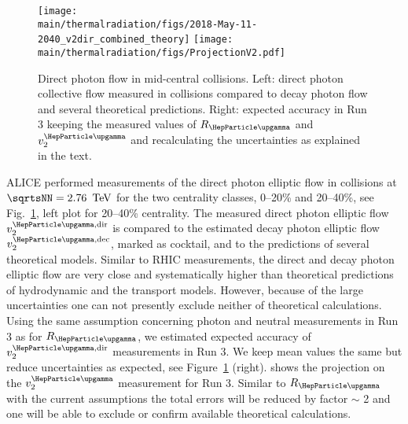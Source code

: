 \begin{figure}[htb]
\centering
\texttt{[image: \\main/thermalradiation/figs/2018-May-11-2040\_v2dir\_combined\_theory]}
\texttt{[image: \\main/thermalradiation/figs/ProjectionV2.pdf]}
\caption{Direct photon flow in mid-central collisions. Left: direct photon collective flow measured in \PbPb{} collisions compared to decay photon flow and several theoretical predictions. Right: expected accuracy in Run 3 keeping the  measured values of $R_{\PGg}$ and $v_{2}^{\PGg}$ and recalculating the uncertainties as explained in the text. }
\label{fig:RealPhotonsV2dir}
\end{figure}

ALICE performed measurements of the direct photon elliptic flow \cite{Acharya:2018bdy} in \PbPb{} collisions at $\sqrtsNN=\unit[2.76]{\UTeV}$ for the two centrality classes, 0--20\% and 20--40\%, see Fig.~\ref{fig:RealPhotonsV2dir}, left plot for 20--40\% centrality.
The measured direct photon elliptic flow $v_2^{\PGg,\rm dir}$ is compared to the estimated decay photon elliptic flow $v_2^{\PGg,\rm dec}$, marked as cocktail, and to the predictions of several theoretical models. Similar to RHIC measurements, the direct and decay photon elliptic flow are very close and systematically higher than theoretical predictions of hydrodynamic  \cite{Gale:2014dfa,Chatterjee:2017akg} and the transport  \cite{Linnyk:2015tha} models. However, because of the large uncertainties  one can not presently exclude neither of theoretical calculations. Using the same assumption concerning photon and neutral measurements in Run 3 as for $R_{\PGg}$, we estimated expected accuracy of $v_2^{\PGg,\rm dir}$ measurements in Run 3. We keep mean values the same but reduce uncertainties as expected, see Figure~\ref{fig:RealPhotonsV2dir} (right). shows the projection on the $v_2^{\PGg}$ measurement 
for Run 3. Similar to $R_{\PGg}$ with the current assumptions the total errors will be reduced by factor $\sim$ 2 and one will be able to exclude or confirm available theoretical calculations.





